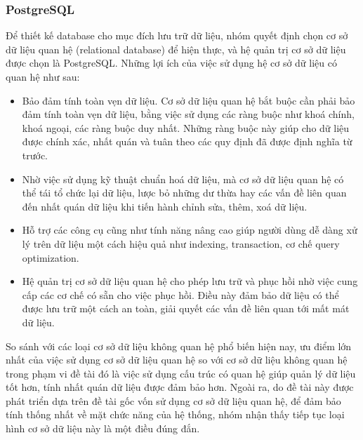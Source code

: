 \subsubsection{PostgreSQL}
Để thiết kế database cho mục đích lưu trữ dữ liệu, nhóm quyết định chọn cơ sở
dữ liệu quan hệ (relational database) để hiện thực, và hệ quản trị cơ sở dữ liệu
được chọn là PostgreSQL. Những lợi ích của việc sử dụng hệ cơ sở dữ liệu có quan
hệ như sau:
\begin{itemize}
    \item Bảo đảm tính toàn vẹn dữ liệu. Cơ sở dữ liệu quan hệ bắt buộc cần phải bảo đảm
          tính toàn vẹn dữ liệu, bằng việc sử dụng các ràng buộc như khoá chính, khoá
          ngoại, các ràng buộc duy nhất. Những ràng buộc này giúp cho dữ liệu được chính
          xác, nhất quán và tuân theo các quy định đã được định nghĩa từ trước.
    \item Nhờ việc sử dụng kỹ thuật chuẩn hoá dữ liệu, mà cơ sở dữ liệu quan hệ có thể
          tái tổ chức lại dữ liệu, lược bỏ những dư thừa hay các vấn đề liên quan đến
          nhất quán dữ liệu khi tiến hành chỉnh sửa, thêm, xoá dữ liệu.
    \item Hỗ trợ các công cụ cũng như tính năng nâng cao giúp người dùng dễ dàng xử lý
          trên dữ liệu một cách hiệu quả như indexing, transaction, cơ chế query
          optimization.
    \item Hệ quản trị cơ sở dữ liệu quan hệ cho phép lưu trữ và phục hồi nhờ việc cung
          cấp các cơ chế có sẵn cho việc phục hồi. Điều này đảm bảo dữ liệu có thể được
          lưu trữ một cách an toàn, giải quyết các vấn đề liên quan tới mất mát dữ liệu.
\end{itemize}
So sánh với các loại cơ sở dữ liệu không quan hệ phổ biến hiện nay, ưu điểm lớn nhất của việc sử dụng cơ sở dữ liệu quan hệ so với cơ sở dữ liệu không quan hệ trong phạm vi đề tài đó là việc sử dụng cấu trúc có quan hệ giúp quản lý dữ liệu tốt hơn, tính nhất quán dữ liệu được đảm bảo hơn. Ngoài ra, do đề tài này được phát triển dựa trên đề tài gốc vốn sử dụng cơ sở dữ liệu quan hệ, để đảm bảo tính thống nhất về mặt chức năng của hệ thống, nhóm nhận thấy tiếp tục loại hình cơ sở dữ liệu này là một điều đúng đắn.
